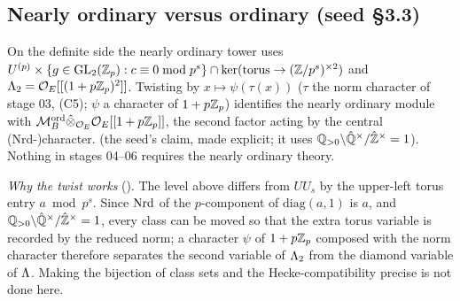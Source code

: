\subsection{Nearly ordinary versus ordinary (seed \S3.3)}
\begin{remark}\label{rem:s04-nearly}
On the definite side the nearly ordinary tower uses $U^{(p)}\times\{g\in\mathrm{GL}_2(\mathbb{Z}_p):c\equiv0\bmod p^s\}\cap\ker(\text{torus}\to(\mathbb{Z}/p^s)^{\times2})$
and $\Lambda_2=\mathcal{O}_E[[(1+p\mathbb{Z}_p)^2]]$. Twisting by $x\mapsto\psi(\tau(x))$ ($\tau$ the norm character of stage 03, (C5); $\psi$ a character of
$1+p\mathbb{Z}_p$) identifies the nearly ordinary module with $\mathcal{M}^{\mathrm{ord}}_B\hat\otimes_{\mathcal{O}_E}\mathcal{O}_E[[1+p\mathbb{Z}_p]]$, the second factor acting by the central
(Nrd-)character. \stsketch{} (the seed's claim, made explicit; it uses $\mathbb{Q}_{>0}\backslash\hat{\mathbb{Q}}^\times/\hat{\mathbb{Z}}^\times=1$). Nothing in
stages 04--06 requires the nearly ordinary theory.
\end{remark}
\noindent\emph{Why the twist works} (\stsketch). The level above differs from $UU_s$ by the upper-left torus entry $a\bmod p^s$. Since
$\mathrm{Nrd}$ of the $p$-component of $\mathrm{diag}(a,1)$ is $a$, and $\mathbb{Q}_{>0}\backslash\hat{\mathbb{Q}}^\times/\hat{\mathbb{Z}}^\times=1$, every class can be moved so
that the extra torus variable is recorded by the reduced norm; a character $\psi$ of $1+p\mathbb{Z}_p$ composed with the norm character therefore
separates the second variable of $\Lambda_2$ from the diamond variable of $\Lambda$. Making the bijection of class sets and the
Hecke-compatibility precise is not done here.
